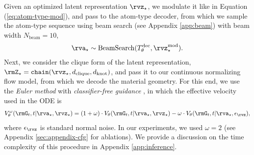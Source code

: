 \documentclass{article}
\theoremstyle{plain}
\theoremstyle{definition}
\theoremstyle{remark}
\begin{document}
Given an optimized latent representation $\rvz_{\star}$, we modulate it like in Equation (\ref{eq:atom-type-mod}), and pass to the atom-type decoder, from which we sample the atom-type sequence using beam search (see Appendix \ref{app:beam}) with beam width $N_{\text{beam}}=10$,
\begin{align}
    \rva_{\star} \sim \operatorname{BeamSearch}(T^{\text{dec}}_{\theta}, \rvz_{\star}^{\text{mod}}).\nonumber
\end{align}
Next, we consider the clique form of the latent representation, $\rmZ_{\star}=\texttt{chain}(\rvz_{\star}, d_{\text{clique}}, d_{\text{knot}})$, and pass it to our continuous normalizing flow model, from which we decode the material geometry.
For this end, we use the \emph{Euler method} with \emph{classifier-free guidance} \citep[CFG]{ho2022classifier}, in which the effective velocity used in the ODE is
\begin{align}
    V^{\omega}_{\theta}(\rmG_t, t |\rva_{\star}, \rvz_{\star}) = (1 + \omega) \cdot V_{\theta}(\rmG_t, t|\rva_{\star}, \rvz_{\star}) - \omega \cdot V_{\theta}(\rmG_t, t | \rva_{\star}, \epsilon_{\rvz}),\nonumber
\end{align}
where $\epsilon_{\rvz}$ is standard normal noise. In our experiments, we used $\omega=2$ (see Appendix \ref{sec:appendix-cfg} for ablations).
We provide a discussion on the time complexity of this procedure in Appendix \ref{app:inference}.
\end{document}

